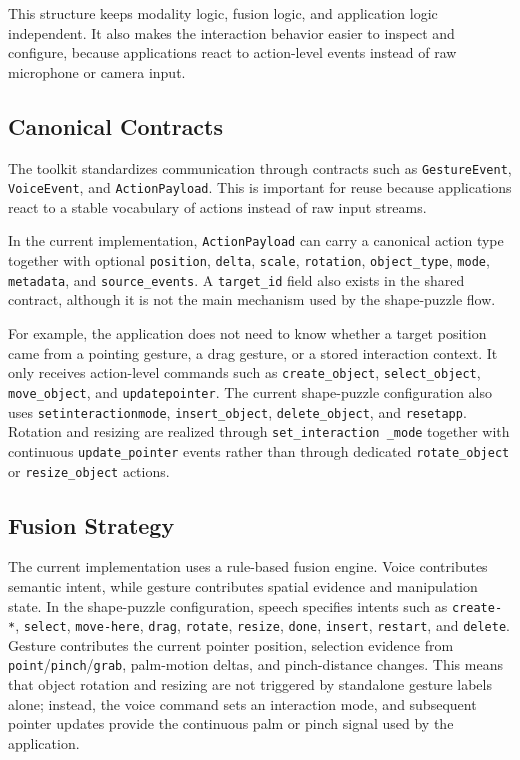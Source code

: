 \documentclass[sigconf]{acmart}
\newcommand{\breakunderscore}{\discretionary{\_}{}{\_}}
\begin{document}
This structure keeps modality logic, fusion logic, and application logic
independent. It also makes the interaction behavior easier to inspect and
configure, because applications react to action-level events instead of raw
microphone or camera input.

\subsection{Canonical Contracts}
The toolkit standardizes communication through contracts such as
\texttt{GestureEvent}, \texttt{VoiceEvent}, and \texttt{ActionPayload}. This is
important for reuse because applications react to a stable vocabulary of actions
instead of raw input streams.

In the current implementation, \texttt{ActionPayload} can carry a canonical
action type together with optional \texttt{position}, \texttt{delta},
\texttt{scale}, \texttt{rotation}, \texttt{object\_type}, \texttt{mode},
\texttt{metadata}, and \texttt{source\_events}. A \texttt{target\_id} field
also exists in the shared contract, although it is not the main mechanism used
by the shape-puzzle flow.

For example, the application does not need to know whether a target position
came from a pointing gesture, a drag gesture, or a stored interaction context.
It only receives action-level commands such as \texttt{create\_object},
\texttt{select\_object}, \texttt{move\_object}, and
\texttt{update\breakunderscore pointer}. The current shape-puzzle configuration also uses
\texttt{set\breakunderscore interaction\breakunderscore mode}, \texttt{insert\_object},
\texttt{delete\_object}, and \texttt{reset\breakunderscore app}. Rotation and resizing are
realized through \texttt{set\_interaction \_mode} together with continuous
\texttt{update\_pointer} events rather than through dedicated
\texttt{rotate\_object} or \texttt{resize\_object} actions.

\subsection{Fusion Strategy}
The current implementation uses a rule-based fusion engine. Voice contributes
semantic intent, while gesture contributes spatial evidence and manipulation
state. In the shape-puzzle configuration, speech specifies intents such as
\texttt{create-*}, \texttt{select}, \texttt{move-here}, \texttt{drag},
\texttt{rotate}, \texttt{resize}, \texttt{done}, \texttt{insert},
\texttt{restart}, and \texttt{delete}. Gesture contributes the current pointer
position, selection evidence from \texttt{point}/\texttt{pinch}/\texttt{grab},
palm-motion deltas, and pinch-distance changes. This means that object rotation
and resizing are not triggered by standalone gesture labels alone; instead, the
voice command sets an interaction mode, and subsequent pointer updates provide
the continuous palm or pinch signal used by the application.
\end{document}
